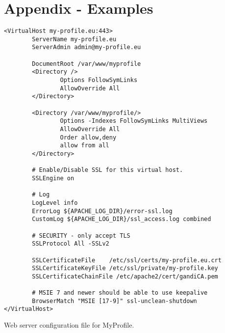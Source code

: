 

\chapter*{Appendix - Examples}

\begin{example}[h]
\begin{verbatim}
<VirtualHost my-profile.eu:443>
        ServerName my-profile.eu
        ServerAdmin admin@my-profile.eu

        DocumentRoot /var/www/myprofile
        <Directory />
                Options FollowSymLinks
                AllowOverride All
        </Directory>

        <Directory /var/www/myprofile/>
                Options -Indexes FollowSymLinks MultiViews
                AllowOverride All
                Order allow,deny
                allow from all
        </Directory>

        # Enable/Disable SSL for this virtual host.
        SSLEngine on

        # Log
        LogLevel info
        ErrorLog ${APACHE_LOG_DIR}/error-ssl.log		
        CustomLog ${APACHE_LOG_DIR}/ssl_access.log combined

        # SECURITY - only accept TLS
        SSLProtocol All -SSLv2
        
        SSLCertificateFile    /etc/ssl/certs/my-profile.eu.crt
        SSLCertificateKeyFile /etc/ssl/private/my-profile.key
        SSLCertificateChainFile /etc/apache2/cert/gandiCA.pem

        # MSIE 7 and newer should be able to use keepalive
        BrowserMatch "MSIE [17-9]" ssl-unclean-shutdown
</VirtualHost>
\end{verbatim}
\caption{Web server configuration file for MyProfile.}
\label{app:mp_conf}
\end{example}

